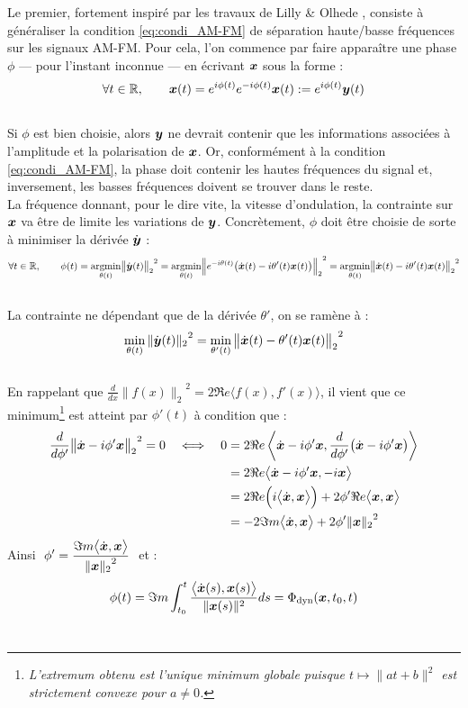 Le premier, fortement inspiré par les travaux de Lilly \& Olhede  \cite{lilly_analysis_2012}, consiste à généraliser la condition \eqref{eq:condi_AM-FM} de séparation haute/basse fréquences sur les signaux AM-FM.
Pour cela, l'on commence par faire apparaître une phase $\phi$ --- pour l'instant inconnue --- en écrivant $\x$ sous la forme :
\[\forall t\in\R,\qquad \x(t) = e^{i\phi(t)} e^{-i\phi(t)} \x(t) \defeq e^{i\phi(t)} \bf{y}(t)\]
\\
Si $\phi$ est bien choisie, alors $\bf{y}$ ne devrait contenir que les informations associées à l'amplitude et la polarisation de $\x$. Or, conformément à la condition \eqref{eq:condi_AM-FM}, la phase doit contenir les hautes fréquences du signal et, inversement, les basses fréquences doivent se trouver dans le reste. 
\\
La fréquence donnant, pour le dire vite, la vitesse d'ondulation, la contrainte sur $\x$ va être de limite les variations de  $\bf{y}$. Concrètement, $\phi$ doit être choisie de sorte à minimiser la dérivée $\dot{\bf{y}}$ :
\[\forall t\in\R,\qquad \phi(t) = \argmin{\theta(t)}{\big\|\dot{\bf{y}}(t)\big\|_2}^2 = \argmin{\theta(t)}{\Big\|e^{-i\theta(t)}\big(\dot{\x}(t) - i\theta'(t) \x(t)\big) \Big\|_2}^2 = \argmin{\theta(t)}{\big\|\dot{\x}(t) - i\theta'(t)\x(t)\big\|_2}^2\]
\\
La contrainte ne dépendant que de la dérivée $\theta'$, on se ramène à :
\[\min_{\theta(t)}{\|\dot{\bf{y}}(t)\|_2}^2 = \min_{\theta'(t)}{\big\|\dot{\x}(t) - \theta'(t) \x(t)\big\|_2}^2\]
\\
En rappelant que $\frac{d}{dx}{\big\|f(x)\big\|_2}^2 = 2\Re e\big\langle f(x), f'(x)\big\rangle$, il vient que ce minimum\footnote{\itshape
	L'extremum obtenu est l'unique minimum globale puisque $t\longmapsto \|at + b\|^2$ est strictement convexe pour $a\neq0$.}
est atteint par $\phi'(t)$ à condition que :
\begin{align*}
	\frac{d}{d\phi'}{\big\| \dot{\x} - i\phi' \x\big\|_2}^2 = 0 \quad \Llr\quad
	0 &= 2\Re e\left\langle  \dot{\x} - i\phi' \x ,  \frac{d}{d\phi'}\big(\dot{\x} - i\phi' \x\big)\right\rangle \\
	&= 2\Re e\big\langle  \dot{\x} - i\phi' \x ,  - i \x\big\rangle \\
	&= 2\Re e\Big(i\big\langle  \dot{\x} ,  \x\big\rangle\Big) + 2\phi'\Re e\big\langle   \x ,  \x\big\rangle\\
	&= -2\Im m\big\langle  \dot{\x} ,  \x\big\rangle + 2\phi'{\| \x\|_2}^2
\end{align*}
Ainsi $\displaystyle \ \phi' = \frac{\Im m\big\langle  \dot{\x} ,  \x\big\rangle}{{\| \x\|_2}^2}\ $ et :
\begin{equation}\label{eq:phas_inst_v1}
  \phi(t) = \Im m\int_{t_0}^t \frac{\big\langle \dot{\x}(s) , \x(s) \big\rangle}{\|\x(s)\|^2} ds = \phased(\x,t_0,t)
\end{equation}
\\

